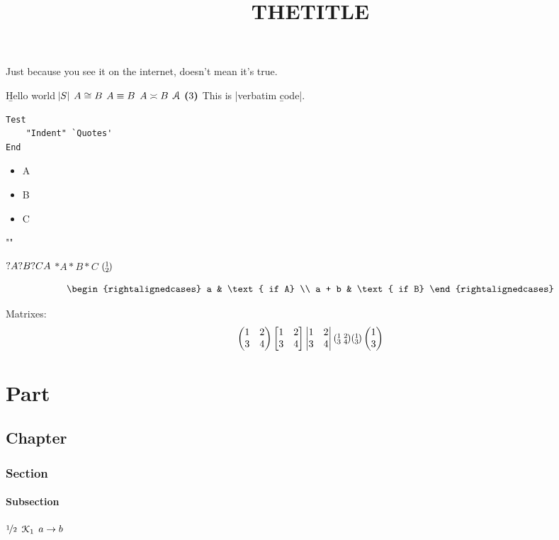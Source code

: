 \documentclass[questionmark=mathcal, asterisk=sz, shortverb, margin=0.5, smallheader, parindent, ragged, nohyphen]{hw}
\title{THETITLE}
\begin{document}
\lipsum[1]

\begin{displayquote}
Just because you see it on the internet, doesn't mean it's true.
\end{displayquote}



\b{Hello world $\sz{S}$ $A \iso B$ $A \con B$ $A \creq B$ $\ayy$ $\bpar{3}$}
This is |verbatim \b code|.

\begin{Verbatim}
Test
	"Indent" `Quotes'
End	
\end{Verbatim}


\begin{itemize}
	\item A
	\item B
	\item C
\end{itemize}

\thm "\thm"

$?A ?B ?C \questionMarkCommand{A}$
$*A *B *C$
$\pt{1;2}$

\[
\begin{rightalignedcases}
    a & \text{ if A} \\
    a + b & \text{ if B}
\end{rightalignedcases} 
\]

Matrixes:
\[
\mx{1 & 2 \\ 3 & 4}
\bmx{1 & 2 \\ 3 & 4}
\detmx{1 & 2 \\ 3 & 4}
\smx{1 & 2 \\ 3 & 4}
\pt{1 ; 3}
\dpt{1 ; 3}
\]

\part{Part}
\chapter{Chapter}
\section{Section}
\subsection{Subsection}

 $\sf{1}{2}$
$\kay[1]$
$\from{a} b$

\end{document}
